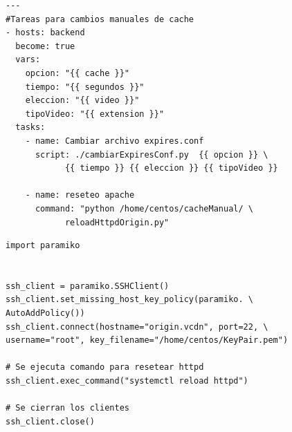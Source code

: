 \documentclass[12pt,a4paper,oneside]{book}
\begin{document}
\vspace{0,5cm}

\begin{lstlisting}[style=codigobase,  caption= cambiarCondicionCache.yml, label=cod_cambiarcache]
---
#Tareas para cambios manuales de cache
- hosts: backend
  become: true
  vars:
    opcion: "{{ cache }}"
    tiempo: "{{ segundos }}"
    eleccion: "{{ video }}"
    tipoVideo: "{{ extension }}"
  tasks:
    - name: Cambiar archivo expires.conf
      script: ./cambiarExpiresConf.py  {{ opcion }} \
            {{ tiempo }} {{ eleccion }} {{ tipoVideo }}

    - name: reseteo apache
      command: "python /home/centos/cacheManual/ \
            reloadHttpdOrigin.py"

\end{lstlisting}


\begin{lstlisting}[style=codigobase, caption= reloadHttpdOrigin.py, label=cod_reloadHTTPD]
import paramiko


ssh_client = paramiko.SSHClient()
ssh_client.set_missing_host_key_policy(paramiko. \
AutoAddPolicy())
ssh_client.connect(hostname="origin.vcdn", port=22, \
username="root", key_filename="/home/centos/KeyPair.pem")

# Se ejecuta comando para resetear httpd
ssh_client.exec_command("systemctl reload httpd")

# Se cierran los clientes
ssh_client.close()
\end{lstlisting}
\end{document}
